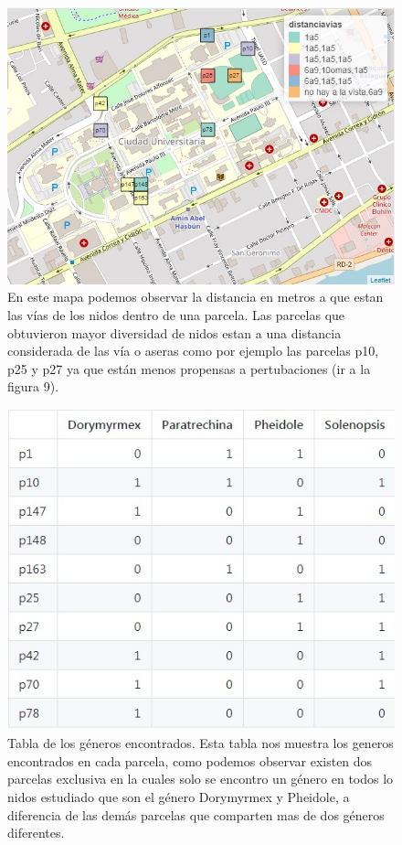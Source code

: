 \documentclass[11pt,]{article}
\begin{document}
\begin{figure}
\centering
\includegraphics{distanciavias.jpg}
\caption{En este mapa podemos observar la distancia en metros a que
estan las vías de los nidos dentro de una parcela. Las parcelas que
obtuvieron mayor diversidad de nidos estan a una distancia considerada
de las vía o aseras como por ejemplo las parcelas p10, p25 y p27 ya que
están menos propensas a pertubaciones (ir a la figura 9).}
\end{figure}

\begin{figure}
\centering
\includegraphics{generos por parcela.jpg}
\caption{Tabla de los géneros encontrados. Esta tabla nos muestra los
generos encontrados en cada parcela, como podemos observar existen dos
parcelas exclusiva en la cuales solo se encontro un género en todos lo
nidos estudiado que son el género Dorymyrmex y Pheidole, a diferencia de
las demás parcelas que comparten mas de dos géneros diferentes.}
\end{figure}
\end{document}

